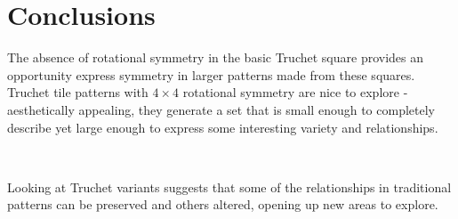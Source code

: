 \documentclass{tufte-book}
\begin{document}


\chapter{Conclusions}

\noindent
The absence of rotational symmetry in the basic Truchet square provides an opportunity express symmetry in larger patterns made from these squares. Truchet tile patterns with $4\times 4$ rotational symmetry are nice to explore - aesthetically appealing, they generate a set that is small enough to completely describe yet large enough to express some interesting variety and relationships.

\,
\vspace{0.4cm}

\noindent
Looking at Truchet variants suggests that some of the relationships in traditional patterns can be preserved and others altered, opening up new areas to explore.

\backmatter
\nocite{*}


\end{document}
